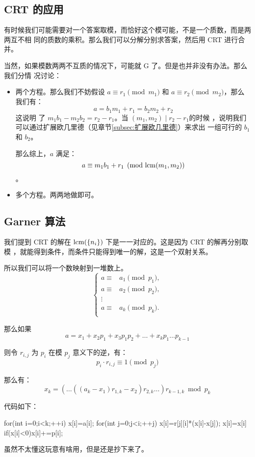 \subsection{CRT 的应用}
有时候我们可能需要对一个答案取模，而恰好这个模可能，不是一个质数，而是两两互不相
同的质数的乘积。那么我们可以分解分别求答案，然后用 CRT 进行合并。

当然，如果模数两两不互质的情况下，可能就 G 了。但是也并非没有办法。那么我们分情
况讨论：
\begin{itemize}
    \item 两个方程。那么我们不妨假设 $a \equiv r_1 \pmod {m_1}$ 和 $a \equiv r_2
        \pmod {m_2}$，那么我们有：\[ a = b_1 m_1 + r_1 = b_2 m_2 + r_2 \]这说明
        了 $m_1 b_1 - m_2 b_2 = r_2 - r_1$。当 $(m_1, m_2) \mid r_2 - r_1$的时候
        ，说明我们可以通过扩展欧几里德（见章节\ref{subsec:扩展欧几里德}）来求出
        一组可行的 $b_1$ 和 $b_2$。

        那么综上，$a$ 满足：\[a \equiv m_1 b_1 + r_1 \pmod{\mathrm{lcm}(m_1, m_2)}\]。
    \item 多个方程。两两地做即可。
\end{itemize}



\subsection{Garner 算法}
我们提到 CRT 的解在 $\mathrm{lcm}(\{n_i\})$ 下是一一对应的。这是因为 CRT 的解再分别取模
，就能得到条件，而条件只能得到唯一的解，这是一个双射关系。

所以我们可以将一个数映射到一堆数上。\[
    \left\{
        \begin{aligned}
            a \equiv{}&{} a_1 \pmod {p_1}, \\
            a \equiv{}&{} a_2 \pmod {p_2}, \\
              \vdots{}&{} \\
            a \equiv{}&{} a_k \pmod {p_k}. \\
        \end{aligned}
    \right.
\]

那么如果\[
a = x_1 + x_2 p_1 + x_3 p_1 p_2 + \ldots + x_k p_1 \ldots p_{k-1}
\]

则令 $r_{i,j}$ 为 $p_i$ 在模 $p_j$ 意义下的逆，有：\[
p_i \cdot r_{i,j} \equiv 1 \pmod{p_j}
\]

那么有：\[
    x_k=(\ldots ((a_k-x_1)r_{1,k}-x_2)r_{2,k} \ldots)r_{k-1,k} \bmod p_k
\]

代码如下：
\begin{Cpp}
for(int i=0;i<k;++i) {
  x[i]=a[i];
  for(int j=0;j<i;++j) {
    x[i]=r[j][i]*(x[i]-x[j]);
    x[i]=x[i]%
    if(x[i]<0)x[i]+=p[i];
  }
}
\end{Cpp}

虽然不太懂这玩意有啥用，但是还是抄下来了。
